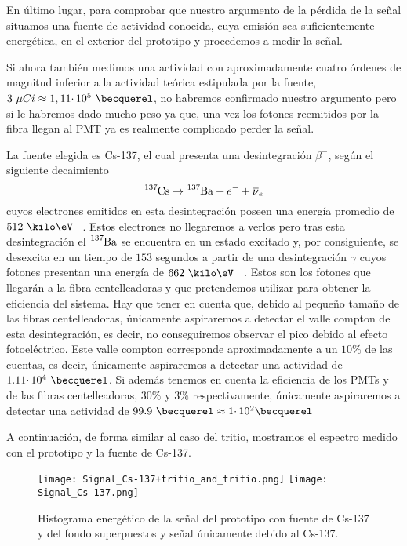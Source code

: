 En último lugar, para comprobar que nuestro argumento de la pérdida de la señal situamos una fuente de actividad conocida, cuya emisión sea suficientemente energética, en el exterior del prototipo y procedemos a medir la señal. 

Si ahora también medimos una actividad con aproximadamente cuatro órdenes de magnitud inferior a la actividad teórica estipulada por la fuente, $3~\mu Ci \approx 1,11 \cdotp 10^{5}~\becquerel$, no habremos confirmado nuestro argumento pero si le habremos dado mucho peso ya que, una vez los fotones reemitidos por la fibra llegan al PMT ya es realmente complicado perder la señal. 

La fuente elegida es Cs-137, el cual presenta una desintegración $\beta^{-}$, según el siguiente decaimiento
\begin{equation}
\ce{^{137}Cs} \rightarrow \ce{^{137}Ba} + e^- + \overline{\nu}_e
\label{desintegracionbeta}
\end{equation}
cuyos electrones emitidos en esta desintegración poseen una energía promedio de $512~\kilo\eV$ ~\cite{Isotopos}. Estos electrones no llegaremos a verlos pero tras esta desintegración el $\ce{^{137}Ba}$ se encuentra en un estado excitado y, por consiguiente, se desexcita en un tiempo de $153$ segundos a partir de una desintegración $\gamma$ cuyos fotones presentan una energía de $662~\kilo\eV$ ~\cite{Isotopos}. Estos son los fotones que llegarán a la fibra centelleadoras y que pretendemos utilizar para obtener la eficiencia del sistema. Hay que tener en cuenta que, debido al pequeño tamaño de las fibras centelleadoras, únicamente aspiraremos a detectar el valle compton de esta desintegración, es decir, no conseguiremos observar el pico debido al efecto fotoeléctrico. Este valle compton corresponde aproximadamente a un $10\%$ de las cuentas, es decir, únicamente aspiraremos a detectar una actividad de $1.11 \cdotp 10^{4}~\becquerel$. Si además tenemos en cuenta la eficiencia de los PMTs y de las fibras centelleadoras, $30\%$ y $3\%$ respectivamente, únicamente aspiraremos a detectar una actividad de $99.9~\becquerel \approx 1 \cdotp 10^{2} \becquerel$

A continuación, de forma similar al caso del tritio, mostramos el espectro medido con el prototipo y la fuente de Cs-137.

\begin{figure}[htb]
\centering
{
\texttt{[image: Signal\_Cs-137+tritio\_and\_tritio.png]} 
}
{
\texttt{[image: Signal\_Cs-137.png]} 
}
\caption{Histograma energético de la señal del prototipo con fuente de Cs-137 y del fondo superpuestos y señal únicamente debido al Cs-137.\label{senalcesio}}
\end{figure}

